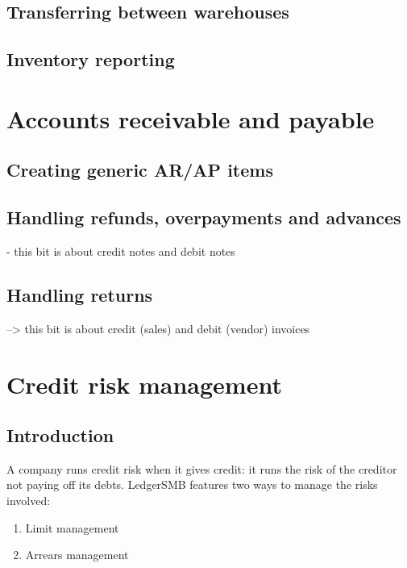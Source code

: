 \section{Transferring between warehouses}

\section{Inventory reporting}



\chapter{Accounts receivable and payable}

\section{Creating generic AR/AP items}

\section{Handling refunds, overpayments and advances}

- this bit is about credit notes and debit notes

\section{Handling returns}

--> this bit is about credit (sales) and debit (vendor) invoices

\chapter{Credit risk management}

\section{Introduction}

A company runs credit risk when it gives credit: it runs the risk of the
creditor not paying off its debts.  LedgerSMB features two ways to manage
the risks involved:

\begin{enumerate}
\item Limit management
\item Arrears management
\end{enumerate}

